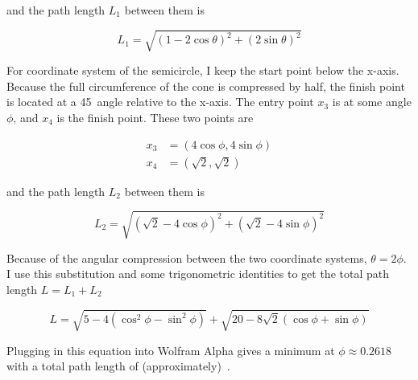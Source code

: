 \documentclass{article}
\begin{document}
and the path length $L_{1}$ between them is

\[
L_{1} = \sqrt{(1-2\cos\theta)^2+(2\sin\theta)^2}
\]

For coordinate system of the semicircle, I keep the start point below the x-axis.
Because the full circumference of the cone is compressed by half, the finish point is located at a 45\textdegree\ angle relative to the x-axis.
The entry point $x_{3}$ is at some angle $\phi$, and $x_{4}$ is the finish point.
These two points are

\begin{align*}
x_{3} &= (4\cos\phi,4\sin\phi) \\
x_{4} &= (\sqrt{2},\sqrt{2})
\end{align*}

and the path length $L_{2}$ between them is

\[
L_{2} = \sqrt{(\sqrt{2}-4\cos\phi)^2+(\sqrt{2}-4\sin\phi)^2}
\]

Because of the angular compression between the two coordinate systems, $\theta=2\phi$.
I use this substitution and some trigonometric identities to get the total path length $L=L_{1}+L_{2}$

\[
L = \sqrt{5-4(\cos^{2}\phi-\sin^{2}\phi)} + \sqrt{20-8\sqrt{2}(\cos\phi+\sin\phi)}
\]

Plugging in this equation into Wolfram Alpha gives a minimum at $\phi\approx0.2618$ with a total path length of (approximately) \,.


\end{document}
